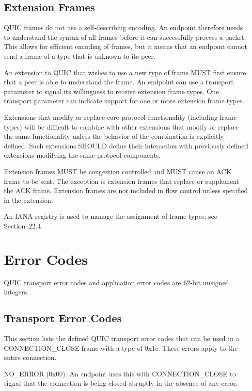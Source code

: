 \documentclass{article}
\begin{document}
\subsection{Extension Frames}

QUIC frames do not use a self-describing encoding.  An endpoint therefore needs to understand the syntax of all frames before it can successfully process a packet.  This allows for efficient encoding of frames, but it means that an endpoint cannot send a frame of a type that is unknown to its peer.

An extension to QUIC that wishes to use a new type of frame MUST first ensure that a peer is able to understand the frame.  An endpoint can use a transport parameter to signal its willingness to receive extension frame types.  One transport parameter can indicate support for one or more extension frame types.

Extensions that modify or replace core protocol functionality (including frame types) will be difficult to combine with other extensions that modify or replace the same functionality unless the behavior of the combination is explicitly defined.  Such extensions SHOULD define their interaction with previously defined extensions modifying the same protocol components.

Extension frames MUST be congestion controlled and MUST cause an ACK frame to be sent.  The exception is extension frames that replace or supplement the ACK frame.  Extension frames are not included in flow control unless specified in the extension.

An IANA registry is used to manage the assignment of frame types; see Section~22.4.

\section{Error Codes}

QUIC transport error codes and application error codes are 62-bit unsigned integers.

\subsection{Transport Error Codes}

This section lists the defined QUIC transport error codes that can be used in a CONNECTION\_CLOSE frame with a type of 0x1c.  These errors apply to the entire connection.

NO\_ERROR (0x00):  An endpoint uses this with CONNECTION\_CLOSE to signal that the connection is being closed abruptly in the absence of any error.
\end{document}

